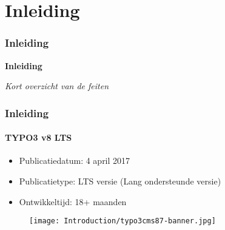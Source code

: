 %

\section{Inleiding}
\begin{frame}[fragile]
	\frametitle{Inleiding}

	\begin{center}\huge{\color{typo3darkgrey}\textbf{Inleiding}}\end{center}
	\begin{center}\large{\textit{Kort overzicht van de feiten}}\end{center}

\end{frame}

\begin{frame}[fragile]
	\frametitle{Inleiding}
	\framesubtitle{TYPO3 v8 LTS}

	\begin{itemize}
		\item Publicatiedatum: 4 april 2017
		\item Publicatietype: LTS versie (Lang ondersteunde versie)
		\item Ontwikkeltijd: 18+ maanden
	\end{itemize}

	\begin{figure}
		\texttt{[image: Introduction/typo3cms87-banner.jpg]}
	\end{figure}

\end{frame}

